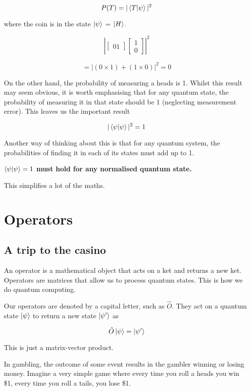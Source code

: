 \documentclass{book}
\begin{document}
$$ P(T) = |\braket{T|\psi}|^2 $$ 

where the coin is in the state $\ket{\psi}$ = $\ket{H}$. 

$$  
\left| \begin{bmatrix} 0  1 \end{bmatrix} \begin{bmatrix} 1 \\ 0 \end{bmatrix} \right|^2 
$$

$$
= \left| (0 \times 1) + (1 \times 0) \right|^2 = 0 
$$


On the other hand, the probability of measuring a heads is 1. Whilst this result may seem obvious, it is worth emphasising that for any quantum state, the probability of measuring it in that state should be 1 (neglecting measurement error). This leaves us the important result

$$ |\braket{\psi|\psi}|^2 = 1 $$

Another way of thinking about this is that for any quantum system, the probabilities of finding it in each of its states must add up to 1. 

\textbf{$ \braket{\psi|\psi} = 1 $ must hold for any normalised quantum state.}

This simplifies a lot of the maths. 

\section{ Operators }

\subsection{ A trip to the casino}

An operator is a mathematical object that acts on a ket and returns a new ket. Operators are matrices that allow us to process quantum states. This is how we do quantum computing. 

Our operators are denoted by a capital letter, such as  $\hat{O}$. They act on a quantum state $\ket{\psi}$ to return a new state $\ket{\psi'}$ as 

$$\hat{O}\ket{\psi} = \ket{\psi'}$$

This is just a matrix-vector product. 

In gambling, the outcome of some event results in the gambler winning or losing money. Imagine a very simple game where every time you roll a heads you win \$1, every time you roll a tails, you lose \$1. 
\end{document}
